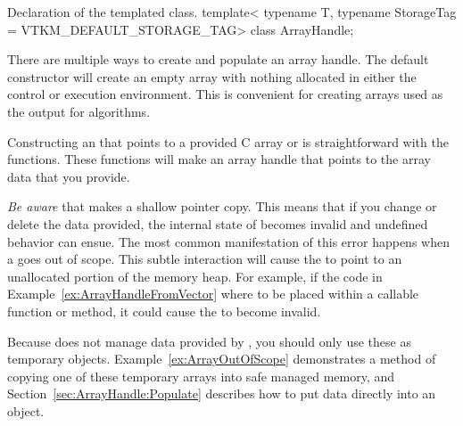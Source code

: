 \begin{vtkmexample}{Declaration of the \protect{} templated class.}
template<
    typename T,
    typename StorageTag = VTKM_DEFAULT_STORAGE_TAG>
class ArrayHandle;
\end{vtkmexample}

There are multiple ways to create and populate an array handle. The default
 constructor will create an empty array with nothing
allocated in either the control or execution environment. This is
convenient for creating arrays used as the output for algorithms.


Constructing an  that points to a provided C array or
 is straightforward with the
 functions. These functions will make an array
handle that points to the array data that you provide.



\emph{Be aware} that  makes a shallow pointer
copy. This means that if you change or delete the data provided, the
internal state of  becomes invalid and
undefined behavior can ensue. The most common manifestation of this error
happens when a  goes out of scope. This subtle
interaction will cause the  to point to an
unallocated portion of the memory heap. For example, if the code in
Example~\ref{ex:ArrayHandleFromVector} where to be placed within a callable
function or method, it could cause the  to become
invalid.

\begin{commonerrors}
  Because  does not manage data provided by
  , you should only use these as
  temporary objects. Example~\ref{ex:ArrayOutOfScope} demonstrates a method
  of copying one of these temporary arrays into safe managed memory, and
  Section~\ref{sec:ArrayHandle:Populate} describes how to put data directly
  into an  object.
\end{commonerrors}

